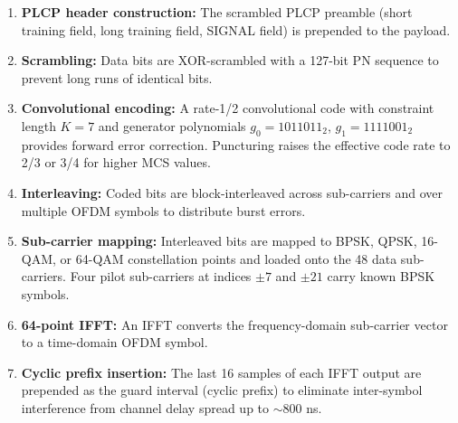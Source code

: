 \documentclass[12pt, a4paper, oneside]{report}
\begin{document}
\begin{enumerate}[noitemsep]
  \item \textbf{PLCP header construction:} The scrambled PLCP preamble (short training field, long training field, SIGNAL field) is prepended to the payload.
  \item \textbf{Scrambling:} Data bits are XOR-scrambled with a 127-bit PN sequence to prevent long runs of identical bits.
  \item \textbf{Convolutional encoding:} A rate-1/2 convolutional code with constraint length $K=7$ and generator polynomials $g_0 = 1011011_2$, $g_1 = 1111001_2$ provides forward error correction. Puncturing raises the effective code rate to 2/3 or 3/4 for higher MCS values.
  \item \textbf{Interleaving:} Coded bits are block-interleaved across sub-carriers and over multiple OFDM symbols to distribute burst errors.
  \item \textbf{Sub-carrier mapping:} Interleaved bits are mapped to BPSK, QPSK, 16-QAM, or 64-QAM constellation points and loaded onto the 48 data sub-carriers. Four pilot sub-carriers at indices $\pm 7$ and $\pm 21$ carry known BPSK symbols.
  \item \textbf{64-point IFFT:} An IFFT converts the frequency-domain sub-carrier vector to a time-domain OFDM symbol.
  \item \textbf{Cyclic prefix insertion:} The last 16 samples of each IFFT output are prepended as the guard interval (cyclic prefix) to eliminate inter-symbol interference from channel delay spread up to $\sim$800 ns.
\end{enumerate}
\end{document}
